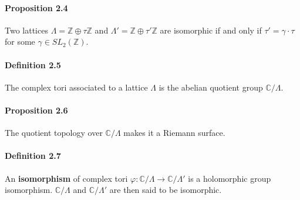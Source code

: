 \documentclass[letterpaper,10pt]{article}
\begin{document}
\paragraph{Proposition 2.4} Two lattices $\Lambda = \mathbb{Z} \oplus \tau\mathbb{Z}$ and $\Lambda' = \mathbb{Z} \oplus \tau'\mathbb{Z}$ are isomorphic if and only if
$\tau' = \gamma \cdot \tau$ for some $\gamma \in SL_2(\mathbb{Z})$.




\paragraph{Definition 2.5} The complex tori associated to a lattice $\Lambda$ is the abelian quotient group $\mathbb{C} / \Lambda$.  

\paragraph{Proposition 2.6} The quotient topology over $\mathbb{C} / \Lambda$ makes it a Riemann surface.

\paragraph{Definition 2.7} An \textbf{isomorphism} of complex tori $\varphi : \mathbb{C} / \Lambda \to \mathbb{C} / \Lambda'$ is a holomorphic 
group isomorphism. $\mathbb{C} / \Lambda$ and $\mathbb{C} / \Lambda'$ are then said to be isomorphic.
\end{document}
